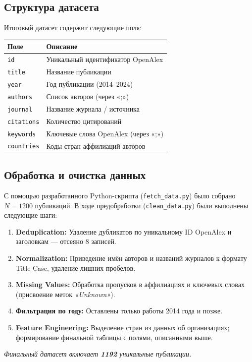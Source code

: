 \documentclass[12pt]{article}
\begin{document}
\subsection{Структура датасета}
Итоговый датасет содержит следующие поля:

\begin{center}
\begin{tabular}{lp{9cm}}
\toprule
\textbf{Поле} & \textbf{Описание} \\
\midrule
\texttt{id}        & Уникальный идентификатор OpenAlex \\
\texttt{title}     & Название публикации \\
\texttt{year}      & Год публикации (2014--2024) \\
\texttt{authors}   & Список авторов (через «;») \\
\texttt{journal}   & Название журнала / источника \\
\texttt{citations} & Количество цитирований \\
\texttt{keywords}  & Ключевые слова OpenAlex (через «;») \\
\texttt{countries} & Коды стран аффилиаций авторов \\
\bottomrule
\end{tabular}
\end{center}

\subsection{Обработка и очистка данных}
С помощью разработанного Python-скрипта (\texttt{fetch\_data.py}) было собрано $N = 1200$ публикаций. В ходе предобработки (\texttt{clean\_data.py}) были выполнены следующие шаги:
\begin{enumerate}
    \item \textbf{Deduplication:} Удаление дубликатов по уникальному ID OpenAlex и заголовкам — отсеяно 8 записей.
    \item \textbf{Normalization:} Приведение имён авторов и названий журналов к формату Title Case, удаление лишних пробелов.
    \item \textbf{Missing Values:} Обработка пропусков в аффилиациях и ключевых словах (присвоение меток \textit{«Unknown»}).
    \item \textbf{Фильтрация по году:} Оставлены только работы 2014 года и позже.
    \item \textbf{Feature Engineering:} Выделение стран из данных об организациях; формирование финальной таблицы с полями, описанными выше.
\end{enumerate}
\textit{Финальный датасет включает \textbf{1192} уникальные публикации.}
\end{document}
